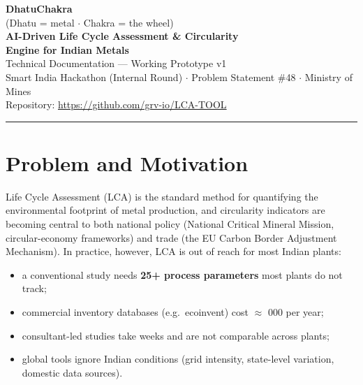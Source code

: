 \documentclass[11pt,a4paper]{article}
\begin{document}
\begin{center}
  {\Huge\bfseries\color{saffron} DhatuChakra}\\[2pt]
  {\large\color{inksoft} (Dhatu = metal $\cdot$ Chakra = the wheel)}\\[8pt]
  {\LARGE\bfseries AI-Driven Life Cycle Assessment \& Circularity\\Engine for Indian Metals}\\[10pt]
  {\normalsize Technical Documentation --- Working Prototype v1}\\[2pt]
  {\normalsize\color{inksoft} Smart India Hackathon (Internal Round) $\cdot$ Problem Statement \#48 $\cdot$ Ministry of Mines}\\[2pt]
  {\normalsize\color{inksoft} Repository: \url{https://github.com/grv-io/LCA-TOOL}}
\end{center}

\vspace{4pt}
\hrule
\vspace{10pt}

\tableofcontents

\section{Problem and Motivation}

Life Cycle Assessment (LCA) is the standard method for quantifying the environmental
footprint of metal production, and circularity indicators are becoming central to both
national policy (National Critical Mineral Mission, circular-economy frameworks) and
trade (the EU Carbon Border Adjustment Mechanism). In practice, however, LCA is out of
reach for most Indian plants:

\begin{itemize}[leftmargin=1.4em, itemsep=1pt]
  \item a conventional study needs \textbf{25+ process parameters} most plants do not track;
  \item commercial inventory databases (e.g.\ ecoinvent) cost $\approx$ 000 per year;
  \item consultant-led studies take weeks and are not comparable across plants;
  \item global tools ignore Indian conditions (grid intensity, state-level variation, domestic data sources).
\end{itemize}
\end{document}

